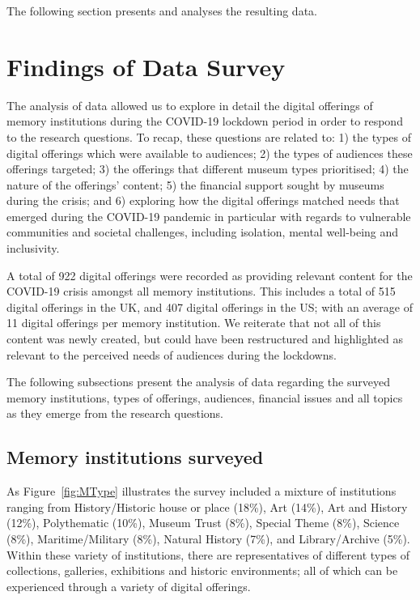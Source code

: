 \documentclass{egpubl}
\begin{document}
The following section presents and analyses the resulting data. 
 

\section{Findings of Data Survey}
\label{find}
The analysis of data allowed us to explore in detail the digital offerings of memory institutions during the COVID-19 lockdown period in order to respond to the research questions. To recap, these questions are related to: 1) the types of digital offerings which were available to audiences; 2) the types of audiences these offerings targeted; 3) the offerings that different museum types prioritised; 4) the nature of the offerings' content; 5) the financial support sought by museums during the crisis; and 6) exploring how the digital offerings matched needs that emerged during the COVID-19 pandemic in particular with regards to vulnerable communities and societal challenges, including isolation, mental well-being and inclusivity. 

A total of 922 digital offerings were recorded as providing relevant content for the COVID-19 crisis amongst all memory institutions. This includes a total of 515 digital offerings in the UK, and 407 digital offerings in the US; with an average of 11 digital offerings per memory institution. We reiterate that not all of this content was newly created, but could have been restructured and highlighted as relevant to the perceived needs of audiences during the lockdowns. 

The following subsections present the analysis of data regarding the surveyed memory institutions, types of offerings, audiences, financial issues and all topics as they emerge from the research questions.

\subsection{Memory institutions surveyed}
\label{inst}
As Figure~\ref{fig:MType} illustrates the survey included a mixture of institutions ranging from History/Historic house or place (18\%), Art (14\%), Art and History (12\%), Polythematic (10\%), Museum Trust (8\%), Special Theme (8\%), Science (8\%), Maritime/Military (8\%), Natural History (7\%), and Library/Archive (5\%). Within these variety of institutions, there are representatives of different types of collections, galleries, exhibitions and historic environments; all of which can be experienced through a variety of digital offerings. 
\end{document}
